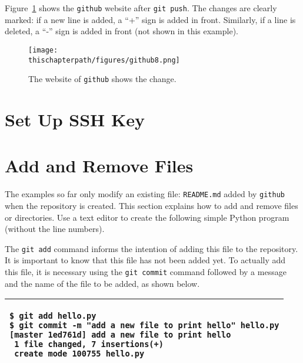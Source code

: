 Figure~\ref{fig:github8} shows the {\tt github} website after {\tt git
  push}.  The changes are clearly marked: if a new line is added, a
``+'' sign is added in front.  Similarly, if a line is deleted, a
``-'' sign is added in front (not shown in this example).

\begin{figure}[h] \centering
{\texttt{[image: \\thischapterpath/figures/github8.png]}}
\caption{The website of {\tt github} shows the change.}
\label{fig:github8}
\end{figure}

\section{Set Up SSH Key}


\section{Add and Remove Files}

The examples so far only modify an existing file: {\tt README.md}
added by {\tt github} when the repository is created.  This section
explains how to add and remove files or directories.  Use a text
editor to create the following simple Python program (without the line
numbers).

\resetlinenumber[1]
\linenumbers
\begin{tt}
  
\end{tt}
\nolinenumbers


The {\tt git add} command informs the intention of adding this file to
the repository.  It is important to know that this file has not been
added yet.  To actually add this file, it is necessary using
the {\tt git commit} command followed by a message and the name of
the file to be added, as shown below.

\vspace{0.2in}

\noindent
\begin{tabular}{|p{5in}|}\hline
\begin{verbatim}
$ git add hello.py
$ git commit -m "add a new file to print hello" hello.py
[master 1ed761d] add a new file to print hello
 1 file changed, 7 insertions(+)
 create mode 100755 hello.py
\end{verbatim}
\\ \hline
\end{tabular}
\vspace{0.2in}

